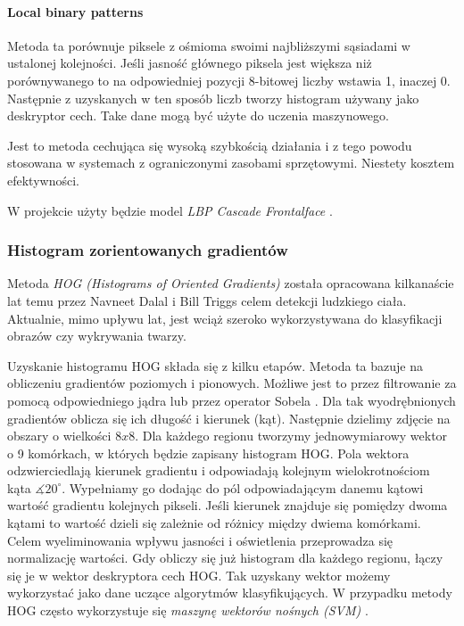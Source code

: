 \paragraph{Local binary patterns}
Metoda ta porównuje piksele z ośmioma swoimi najbliższymi sąsiadami w ustalonej kolejności. Jeśli jasność głównego piksela jest większa niż porównywanego to na odpowiedniej pozycji 8-bitowej liczby wstawia 1, inaczej 0. Następnie z uzyskanych w ten sposób liczb tworzy histogram używany jako deskryptor cech. Take dane mogą być użyte do uczenia maszynowego. \cite{comp_haar_lbp}
\par
Jest to metoda cechująca się wysoką szybkością działania i z tego powodu stosowana w systemach z ograniczonymi zasobami sprzętowymi. Niestety kosztem efektywności.
\par
W projekcie użyty będzie model \textit{LBP Cascade Frontalface} \cite{lbp_xml}.


\subsubsection{Histogram zorientowanych gradientów}
Metoda \textit{HOG (Histograms of Oriented Gradients)} \cite{hog_article} została opracowana kilkanaście lat temu przez Navneet Dalal i Bill Triggs celem detekcji ludzkiego ciała. Aktualnie, mimo upływu lat, jest wciąż szeroko wykorzystywana do klasyfikacji obrazów czy wykrywania twarzy.
\par
Uzyskanie histogramu HOG składa się z kilku etapów. Metoda \cite{hog_wprowadzenie} \cite{learnopencv_HOG} \cite{guide_hog} ta bazuje na obliczeniu gradientów poziomych i pionowych. Możliwe jest to przez filtrowanie za pomocą odpowiedniego jądra lub przez operator Sobela \cite{feature_extraction}. Dla tak wyodrębnionych gradientów oblicza się ich długość i kierunek (kąt). Następnie dzielimy zdjęcie na obszary o wielkości $8x8$. Dla każdego regionu tworzymy jednowymiarowy wektor o 9 komórkach, w których będzie zapisany histogram HOG. Pola wektora odzwierciedlają kierunek gradientu i odpowiadają kolejnym wielokrotnościom kąta $\measuredangle 20 ^{\circ}$. Wypełniamy go dodając do pól odpowiadającym danemu kątowi wartość gradientu kolejnych pikseli. Jeśli kierunek znajduje się pomiędzy dwoma kątami to wartość dzieli się zależnie od różnicy między dwiema komórkami. Celem wyeliminowania wpływu jasności i oświetlenia przeprowadza się normalizację wartości. Gdy obliczy się już histogram dla każdego regionu, łączy się je w wektor deskryptora cech HOG. Tak uzyskany wektor możemy wykorzystać jako dane uczące algorytmów klasyfikujących. W przypadku metody HOG często wykorzystuje się \textit{maszynę wektorów nośnych (SVM)} \cite{svm_toward_science}.

